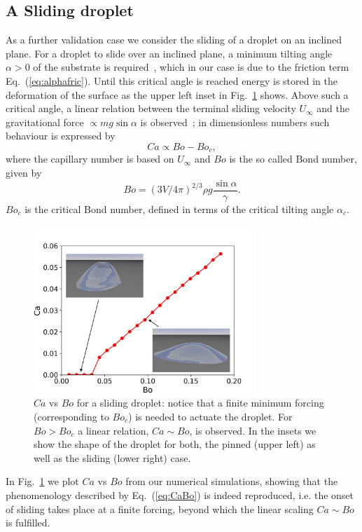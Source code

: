 \subsection{A Sliding droplet}
As a further validation case we consider the sliding of a droplet on an inclined plane.
For a droplet to slide over an inclined plane, a minimum tilting angle $\alpha >0$ of the substrate is required~\cite{furmidgeStudiesPhaseInterfaces1962}, which in our case is due to the friction term Eq.~(\ref{eq:alphafric}). 
Until this critical angle is reached energy is stored in the deformation of the surface as the upper left inset in Fig.~\ref{fig:CaBo} shows. 
Above such a critical angle, a linear relation between the terminal sliding velocity $U_{\infty}$ and the gravitational force $\propto m g \sin \alpha$ is observed~\cite{podgorskiCornersCuspsPearls2001,kimSlidingLiquidDrops2002,sbragagliaSlidingDropsAlternating2014}; in dimensionless numbers such behaviour is expressed by 
\begin{equation}\label{eq:CaBo}
  Ca \propto Bo - Bo_c,
\end{equation}
where the capillary number is based on $U_{\infty}$ and $Bo$ is the so called Bond number, given by
\begin{equation}
  Bo = (3V/4\pi)^{2/3}\rho g \frac{\sin\alpha}{\gamma}.
\end{equation}
$Bo_c$ is the critical Bond number, defined in terms of the critical tilting angle $\alpha_c$.
  \begin{figure}
    \centering
    \includegraphics[width=0.75\textwidth]{graphics/Fig_7_Ca_Bo_true_with_pic.png}
    \caption{$Ca$ vs $Bo$ for a sliding droplet: notice that a finite minimum forcing (corresponding to $Bo_c$) is needed to actuate the droplet. For $Bo > Bo_c$ a linear relation, $Ca \sim Bo$, is observed. In the insets we show the shape of the droplet for both, the pinned (upper left) as well as the sliding (lower right) case.
    }
    \label{fig:CaBo}
\end{figure}
In Fig.~\ref{fig:CaBo} we plot $Ca$ vs $Bo$ from our numerical simulations, showing that the phenomenology described by Eq.~(\ref{eq:CaBo}) is indeed reproduced, i.e. the onset of sliding takes place at a finite forcing, beyond which the linear scaling $Ca \sim Bo$ is fulfilled. 

